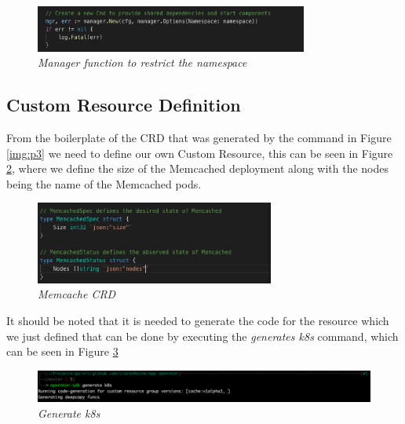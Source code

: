 \begin{figure}[!ht]
\centering
\includegraphics*[width=0.8\textwidth]{images/p6.png}
\caption{\em Manager function to restrict the namespace}
\label{img:p6}
\end{figure}

\subsection{Custom Resource Definition}
\label{sub:crd}
From the boilerplate of the CRD that was generated by the command in Figure \ref{img:p3} we need to define our own Custom Resource, this can be seen in Figure \ref{img:p8}, where we define the size of the Memcached deployment along with the nodes being the name of the Memcached pods.
\begin{figure}[!hb]
\centering
\includegraphics*[width=0.7\textwidth]{images/p8.png}
\caption{\em Memcache CRD }
\label{img:p8}
\end{figure}

It should be noted that it is needed to generate the code for the resource which we just defined that can be done by executing the \textit{generates k8s} command, which can be seen in Figure \ref{img:p9}
\begin{figure}[!hb]
\centering
\includegraphics*[width=1\textwidth]{images/p9.png}
\caption{\em Generate k8s}
\label{img:p9}
\end{figure}

